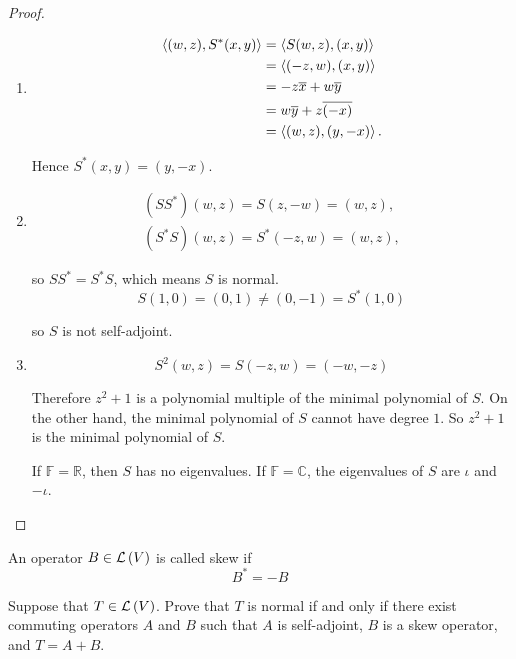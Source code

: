 \begin{proof}
    \begin{enumerate}[label={(\alph*)}]
        \item \begin{align*}
                  \left\langle{(w, z), S^{*}(x, y)}\right\rangle & = \left\langle{S(w, z), (x, y)}\right\rangle  \\
                                                  & = \left\langle{(-z, w), (x, y)}\right\rangle  \\
                                                  & = -z\overline{x} + w\overline{y}       \\
                                                  & = w\overline{y} + z\overline{(-x)}     \\
                                                  & = \left\langle{(w, z), (y, -x)}\right\rangle.
              \end{align*}

              Hence $S^{*}(x, y) = (y, -x)$.
        \item \[
                  \begin{split}
                      (SS^{*})(w, z) = S(z, -w) = (w, z), \\
                      (S^{*}S)(w, z) = S^{*}(-z, w) = (w, z),
                  \end{split}
              \]

              so $SS^{*} = S^{*}S$, which means $S$ is normal.
              \[
                  S(1, 0) = (0, 1) \ne (0, -1) = S^{*}(1, 0)
              \]

              so $S$ is not self-adjoint.
        \item
              \[
                  S^{2}(w, z) = S(-z, w) = (-w, -z)
              \]

              Therefore $z^{2} + 1$ is a polynomial multiple of the minimal polynomial of $S$. On the other hand, the minimal polynomial of $S$ cannot have degree $1$. So $z^{2} + 1$ is the minimal polynomial of $S$.

              If $\mathbb{F} = \mathbb{R}$, then $S$ has no eigenvalues. If $\mathbb{F} = \mathbb{C}$, the eigenvalues of $S$ are $\iota$ and $-\iota$.
    \end{enumerate}
\end{proof}
\newpage

\begin{exercise}
    An operator $B\in\mathcal{L}\left({V}\right)$ is called skew if
    \[
        B^{*} = -B
    \]

    Suppose that $T\in\mathcal{L}\left({V}\right)$. Prove that $T$ is normal if and only if there exist commuting operators $A$ and $B$ such that $A$ is self-adjoint, $B$ is a skew operator, and $T = A + B$.
\end{exercise}

